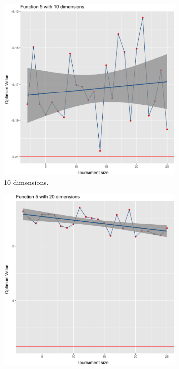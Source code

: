 \begin{figure}[t]
	\begin{subfigure}[b]{0.33\textwidth}
		\centering
		\includegraphics[width=\textwidth]{img/5dim_10.ps}
		\caption{10 dimensions.}
	\end{subfigure}
	\begin{subfigure}[b]{0.33\textwidth}
		\centering
		\includegraphics[width=\textwidth]{img/5dim_20.ps}

\end{subfigure}
\end{figure}

